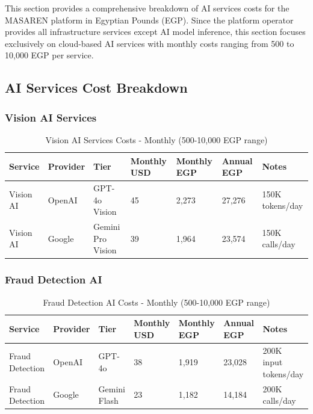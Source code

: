 \documentclass[11pt,a4paper]{article}
\begin{document}
This section provides a comprehensive breakdown of AI services costs for the MASAREN platform in Egyptian Pounds (EGP). Since the platform operator provides all infrastructure services except AI model inference, this section focuses exclusively on cloud-based AI services with monthly costs ranging from 500 to 10,000 EGP per service.

\subsection{AI Services Cost Breakdown}

\subsubsection{Vision AI Services}

\begin{table}[H]
\centering
\footnotesize
\begin{tabular}{|l|l|l|l|l|l|l|}
\hline
\textbf{Service} & \textbf{Provider} & \textbf{Tier} & \textbf{Monthly USD} & \textbf{Monthly EGP} & \textbf{Annual EGP} & \textbf{Notes} \\
\hline
Vision AI & OpenAI & GPT-4o Vision & 45 & 2,273 & 27,276 & 150K tokens/day \\
Vision AI & Google & Gemini Pro Vision & 39 & 1,964 & 23,574 & 150K calls/day \\
\hline
\end{tabular}
\caption{Vision AI Services Costs - Monthly (500-10,000 EGP range)}
\end{table}

\subsubsection{Fraud Detection AI}

\begin{table}[H]
\centering
\footnotesize
\begin{tabular}{|l|l|l|l|l|l|l|}
\hline
\textbf{Service} & \textbf{Provider} & \textbf{Tier} & \textbf{Monthly USD} & \textbf{Monthly EGP} & \textbf{Annual EGP} & \textbf{Notes} \\
\hline
Fraud Detection & OpenAI & GPT-4o & 38 & 1,919 & 23,028 & 200K input tokens/day \\
Fraud Detection & Google & Gemini Flash & 23 & 1,182 & 14,184 & 200K calls/day \\
\hline
\end{tabular}
\caption{Fraud Detection AI Costs - Monthly (500-10,000 EGP range)}
\end{table}
\end{document}
